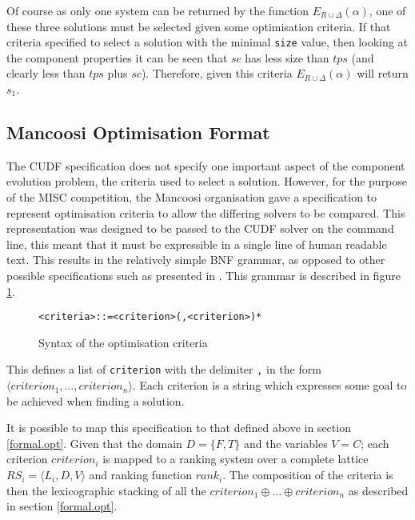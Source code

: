 Of course as only one system can be returned by the function $E_{R \cup \Delta}(\alpha)$, one of these three solutions must be selected given some optimisation criteria.
If that criteria specified to select a solution with the minimal \verb+size+ value, 
then looking at the component properties it can be seen that $sc$ has less size than $tps$ (and clearly less than $tps$ plus $sc$).
Therefore, given this criteria $E_{R \cup \Delta}(\alpha)$ will return  $s_1$.

\subsection{Mancoosi Optimisation Format}
\label{formal.mancoosioptimisationformat}
The CUDF specification does not specify one important aspect of the component evolution problem, the criteria used to select a solution.
However, for the purpose of the MISC competition, the Mancoosi organisation gave a specification to represent optimisation criteria to allow the differing solvers to be compared.
This representation was designed to be passed to the CUDF solver on the command line, this meant that it must be expressible in a single line of human readable text.
This results in the relatively simple BNF grammar, as opposed to other possible specifications such as presented in \cite{treinen2009}. 
This grammar is described in figure \ref{formal.optbnf}.

\begin{figure}[h!]
\begin{center}
\begin{alltt}
<criteria> ::= <criterion> (, <criterion>)*
\end{alltt}
  \caption{Syntax of the optimisation criteria}
  \label{formal.optbnf}
\end{center}
\end{figure}

This defines a list of \verb+criterion+ with the delimiter \verb+,+ in the form $\langle criterion_1, \ldots, criterion_n \rangle$.
Each criterion is a string which expresses some goal to be achieved when finding a solution.

It is possible to map this specification to that defined above in section \ref{formal.opt}.
Given that the domain $D = \{F,T\}$ and the variables $V = C$;
each criterion $criterion_i$ is mapped to a ranking system over a complete lattice $RS_i = \langle L_i,D,V \rangle$
and ranking function $rank_i$.
The composition of the criteria is then the lexicographic stacking of all the $criterion_1 \oplus \ldots \oplus criterion_n$ as described in section \ref{formal.opt}.

